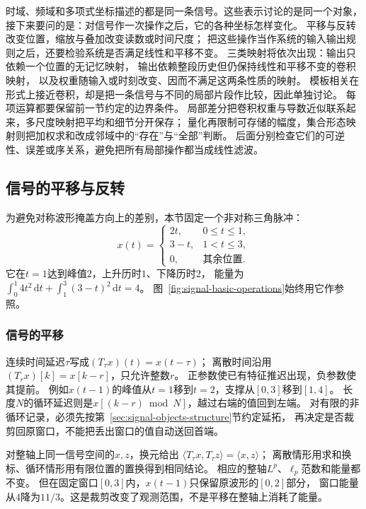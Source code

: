 时域、频域和多项式坐标描述的都是同一条信号。这些表示讨论的是同一个对象，
接下来要问的是：对信号作一次操作之后，它的各种坐标怎样变化。
平移与反转改变位置，缩放与叠加改变读数或时间尺度；
把这些操作当作系统的输入输出规则之后，还要检验系统是否满足线性和平移不变。
三类映射将依次出现：输出只依赖一个位置的无记忆映射，
输出依赖整段历史但仍保持线性和平移不变的卷积映射，
以及权重随输入或时刻改变、因而不满足这两条性质的映射。
模板相关在形式上接近卷积，却是把一条信号与不同的局部片段作比较，因此单独讨论。
每项运算都要保留前一节约定的边界条件。
局部差分把卷积权重与导数近似联系起来，多尺度映射把平均和细节分开保存；
量化再限制可存储的幅度，集合形态映射则把加权求和改成邻域中的“存在”与“全部”判断。
后面分别检查它们的可逆性、误差或序关系，避免把所有局部操作都当成线性滤波。

\subsection{信号的平移与反转}

为避免对称波形掩盖方向上的差别，本节固定一个非对称三角脉冲：
\begin{equation}
  x(t)=
  \begin{cases}
    2t,&0\leq t\leq1,\\
    3-t,&1<t\leq3,\\
    0,&\text{其余位置}.
  \end{cases}
  \label{eq:signal-asymmetric-wave}
\end{equation}
它在$t=1$达到峰值$2$，上升历时$1$、下降历时$2$，
能量为$\int_0^1 4t^2\,\mathrm dt+\int_1^3(3-t)^2\,\mathrm dt=4$。
图~\ref{fig:signal-basic-operations}始终用它作参照。

\subsubsection{信号的平移}

连续时间延迟$\tau$写成$(T_\tau x)(t)=x(t-\tau)$；
离散时间沿用$(T_rx)[k]=x[k-r]$，只允许整数$r$。
正参数使已有特征推迟出现，负参数使其提前。
例如$x(t-1)$的峰值从$t=1$移到$t=2$，支撑从$[0,3]$移到$[1,4]$。
长度$N$的循环延迟则是$x[(k-r)\bmod N]$，越过右端的值回到左端。
对有限的非循环记录，必须先按第~\ref{sec:signal-objects-structure}节约定延拓，
再决定是否裁剪回原窗口，不能把丢出窗口的值自动送回首端。

对整轴上同一信号空间的$x,z$，换元给出
$\langle T_\tau x,T_\tau z\rangle=\langle x,z\rangle$；
离散情形用求和换标、循环情形用有限位置的置换得到相同结论。
相应的整轴$L^p$、$\ell_p$范数和能量都不变。
但在固定窗口$[0,3]$内，$x(t-1)$只保留原波形的$[0,2]$部分，
窗口能量从$4$降为$11/3$。这是裁剪改变了观测范围，不是平移在整轴上消耗了能量。

